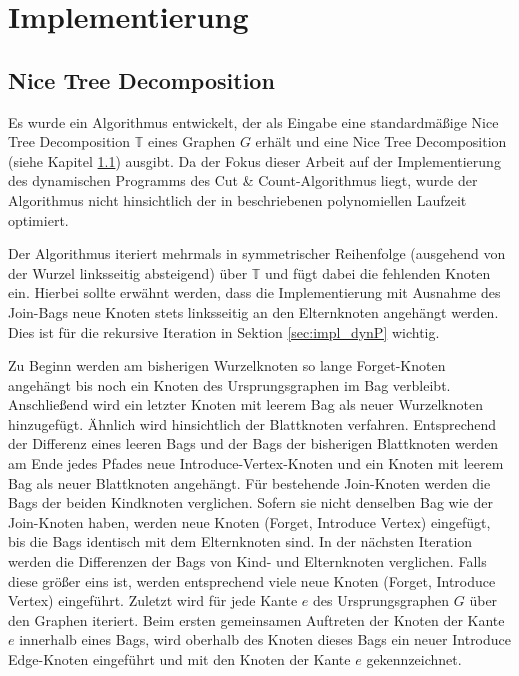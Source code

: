 \chapter{Implementierung}
\label{c:impl}

\section{Nice Tree Decomposition}
\label{sec:impl_ntd}
Es wurde ein Algorithmus entwickelt, der als Eingabe eine standardmäßige Nice Tree Decomposition $\mathbb{T}$ eines Graphen $G$ erhält und eine Nice Tree Decomposition (siehe Kapitel \ref{sec:impl_ntd}) ausgibt. 
Da der Fokus dieser Arbeit auf der Implementierung des dynamischen Programms des Cut \& Count-Algorithmus liegt, wurde der Algorithmus nicht hinsichtlich der in \cite{kloks1994} beschriebenen polynomiellen Laufzeit optimiert. 

Der Algorithmus iteriert mehrmals in symmetrischer Reihenfolge (ausgehend von der Wurzel linksseitig absteigend) über $\mathbb{T}$ und fügt dabei die fehlenden Knoten ein. 
Hierbei sollte erwähnt werden, dass die Implementierung mit Ausnahme des \glqq Join\grqq -Bags neue Knoten stets linksseitig an den Elternknoten angehängt werden. 
Dies ist für die rekursive Iteration in Sektion \ref{sec:impl_dynP} wichtig.

Zu Beginn werden am bisherigen Wurzelknoten so lange \glqq Forget\grqq -Knoten angehängt bis noch ein Knoten des Ursprungsgraphen im Bag verbleibt. Anschließend wird ein letzter Knoten mit leerem Bag als neuer Wurzelknoten hinzugefügt. 
Ähnlich wird hinsichtlich der Blattknoten verfahren. 
Entsprechend der Differenz eines leeren Bags und der Bags der bisherigen Blattknoten werden am Ende jedes Pfades neue \glqq Introduce-Vertex\grqq -Knoten und ein Knoten mit leerem Bag als neuer Blattknoten angehängt. 
Für bestehende \glqq Join\grqq -Knoten werden die Bags der beiden Kindknoten verglichen. 
Sofern sie nicht denselben Bag wie der \glqq Join\grqq -Knoten haben, werden neue Knoten (\glqq Forget\grqq , \glqq Introduce Vertex\grqq ) eingefügt, bis die Bags identisch mit dem Elternknoten sind. 
In der nächsten Iteration werden die Differenzen der Bags von Kind- und Elternknoten verglichen. 
Falls diese größer eins ist, werden entsprechend viele neue Knoten (\glqq Forget\grqq , \glqq Introduce Vertex\grqq ) eingeführt.
Zuletzt wird für jede Kante $e$ des Ursprungsgraphen $G$ über den Graphen iteriert. 
Beim ersten gemeinsamen Auftreten der Knoten der Kante $e$ innerhalb eines Bags, wird oberhalb des Knoten dieses Bags ein neuer \glqq Introduce Edge\grqq -Knoten eingeführt und mit den Knoten der Kante $e$ gekennzeichnet.

